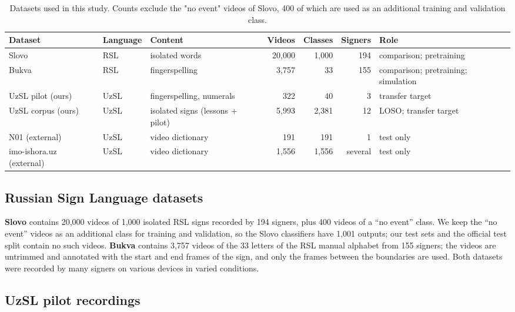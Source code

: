 \documentclass[a4paper,fleqn]{cas-dc}
\begin{document}
\begin{table}[t]
\caption{Datasets used in this study. Counts exclude the "no event" videos of Slovo, 400 of which are used as an additional training and validation class.}\label{tab:datasets}
\footnotesize\setlength{\tabcolsep}{4pt}
\centering
\begin{tabular}{lllrrrl}
\toprule
\textbf{Dataset} & \textbf{Language} & \textbf{Content} & \textbf{Videos} & \textbf{Classes} & \textbf{Signers} & \textbf{Role} \\
\midrule
Slovo & RSL & isolated words & 20,000 & 1,000 & 194 & comparison; pretraining \\
Bukva & RSL & fingerspelling & 3,757 & 33 & 155 & comparison; pretraining; simulation \\
UzSL pilot (ours) & UzSL & fingerspelling, numerals & 322 & 40 & 3 & transfer target \\
UzSL corpus (ours) & UzSL & isolated signs (lessons + pilot) & 5,993 & 2,381 & 12 & LOSO; transfer target \\
N01 (external) & UzSL & video dictionary & 191 & 191 & 1 & test only \\
imo-ishora.uz (external) & UzSL & video dictionary & 1,556 & 1,556 & several & test only \\
\bottomrule
\end{tabular}
\end{table}

\hypertarget{russian-sign-language-datasets}{%
\subsection{Russian Sign Language datasets}\label{russian-sign-language-datasets}}

\textbf{Slovo} \cite{2023_kapitanov_slovo} contains 20,000 videos of 1,000 isolated RSL signs recorded by 194 signers, plus 400 videos of a ``no event'' class. We keep the ``no event'' videos as an additional class for training and validation, so the Slovo classifiers have 1,001 outputs; our test sets and the official test split contain no such videos. \textbf{Bukva} \cite{2024_kvanchiani_bukva} contains 3,757 videos of the 33 letters of the RSL manual alphabet from 155 signers; the videos are untrimmed and annotated with the start and end frames of the sign, and only the frames between the boundaries are used. Both datasets were recorded by many signers on various devices in varied conditions.

\hypertarget{uzsl-pilot-recordings}{%
\subsection{UzSL pilot recordings}\label{uzsl-pilot-recordings}}
\end{document}
